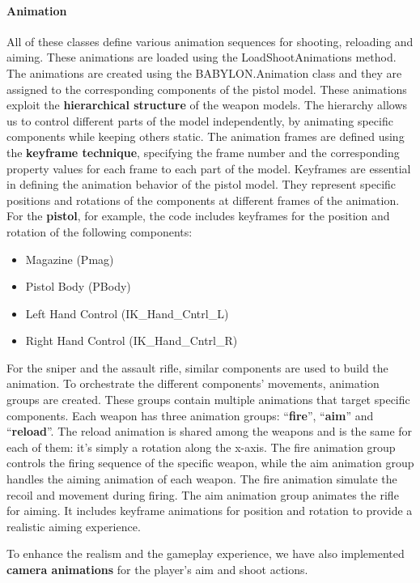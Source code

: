\documentclass[12pt,a4paper,oneside]{article}
\theoremstyle{definition}
\begin{document}
\paragraph{Animation} All of these classes define various animation sequences for shooting, reloading and aiming. These animations are loaded using the LoadShootAnimations method. The animations are created using the BABYLON.Animation class and they are assigned to the corresponding components of the pistol model. These animations exploit the \textbf{hierarchical structure} of the weapon models. The hierarchy allows us to control different parts of the model independently, by animating specific components while keeping others static. The animation frames are defined using the \textbf{keyframe technique}, specifying the frame number and the corresponding property values for each frame to each part of the model. Keyframes are essential in defining the animation behavior of the pistol model. They represent specific positions and rotations of the components at different frames of the animation. For the \textbf{pistol}, for example, the code includes keyframes for the position and rotation of the following components:

\begin{itemize}
    \item Magazine (Pmag)
    \item Pistol Body (PBody)
    \item Left Hand Control (IK\_Hand\_Cntrl\_L)
    \item Right Hand Control (IK\_Hand\_Cntrl\_R)
\end{itemize}

For the sniper and the assault rifle, similar components are used to build the animation.
To orchestrate the different components' movements, animation groups are created. These groups contain multiple animations that target specific components. Each weapon has three animation groups: ``\textbf{fire}'', ``\textbf{aim}'' and ``\textbf{reload}''. The reload animation is shared among the weapons and is the same for each of them: it's simply a rotation along the x-axis. The fire animation group controls the firing sequence of the specific weapon, while the aim animation group handles the aiming animation of each weapon. The fire animation simulate the recoil and movement during firing. The aim animation group animates the rifle for aiming. It includes keyframe animations for position and rotation to provide a realistic aiming experience.

To enhance the realism and the gameplay experience, we have also implemented \textbf{camera animations} for the player's aim and shoot actions.
\end{document}
